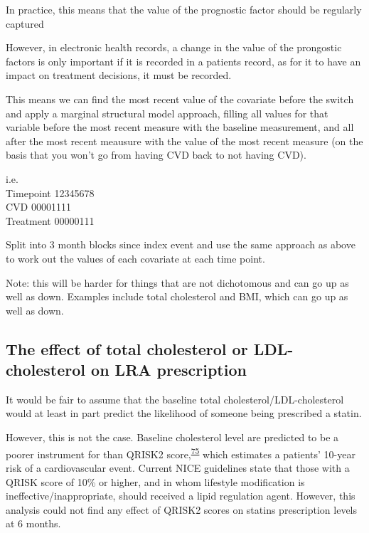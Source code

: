 \documentclass[a4paper, twoside]{templates/ociamthesis}
\begin{document}
In practice, this means that the value of the prognostic factor should be regularly captured

However, in electronic health records, a change in the value of the prongostic factors is only important if it is recorded in a patients record, as for it to have an impact on treatment decisions, it must be recorded.

This means we can find the most recent value of the covariate before the switch and apply a marginal structural model approach, filling all values for that variable before the most recent measure with the baseline measurement, and all after the most recent meausure with the value of the most recent measure (on the basis that you won't go from having CVD back to not having CVD).

i.e.\\
Timepoint 12345678\\
CVD 00001111\\
Treatment 00000111

Split into 3 month blocks since index event and use the same approach as above to work out the values of each covariate at each time point.

Note: this will be harder for things that are not dichotomous and can go up as well as down. Examples include total cholesterol and BMI, which can go up as well as down.

\hypertarget{the-effect-of-total-cholesterol-or-ldl-cholesterol-on-lra-prescription}{%
\subsection{The effect of total cholesterol or LDL-cholesterol on LRA prescription}\label{the-effect-of-total-cholesterol-or-ldl-cholesterol-on-lra-prescription}}

It would be fair to assume that the baseline total cholesterol/LDL-cholesterol would at least in part predict the likelihood of someone being prescribed a statin.

However, this is not the case. Baseline cholesterol level are predicted to be a poorer instrument for than QRISK2 score,\textsuperscript{\protect\hyperlink{ref-hippisley-cox2008}{75}} which estimates a patients' 10-year risk of a cardiovascular event. Current NICE guidelines state that those with a QRISK score of 10\% or higher, and in whom lifestyle modification is ineffective/inappropriate, should received a lipid regulation agent. However, this analysis could not find any effect of QRISK2 scores on statins prescription levels at 6 months.
\end{document}
